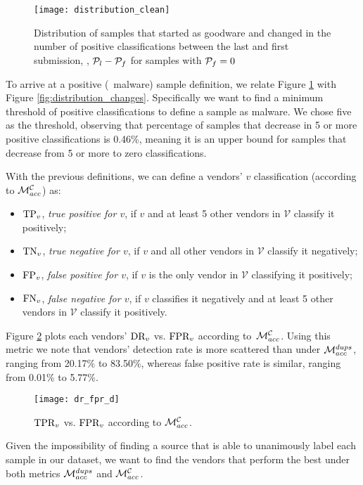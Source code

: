 \begin{figure}[!h]
	\centering
	\texttt{[image: distribution\_clean]}
	\caption{Distribution of samples that started as goodware and changed in the number of positive classifications between the last and first submission, \ie, $\mathcal{P}_{l}-\mathcal{P}_{f}$ for samples with $\mathcal{P}_{f}=0$}
	\label{fig:distribution_clean}
\end{figure}

To arrive at a positive (\ie\ malware) sample definition, we relate Figure \ref{fig:distribution_clean} with Figure \ref{fig:distribution_changes}.
Specifically we want to find a minimum threshold of positive classifications to define a sample as malware.
We chose five as the threshold, observing that percentage of samples that decrease in 5 or more positive classifications is 0.46\%, meaning it is an upper bound for samples that decrease from 5 or more to zero classifications. 

With the previous definitions, we can define a vendors' $v$ classification (according to $\mathcal{M}_{acc}^{\mathcal{C}}$) as:

\begin{itemize}%
	\item $\textrm{TP}_v$, \emph{true positive for $v$}, if $v$ and at least 5 other vendors in $\mathcal{V}$ classify it positively;
	\item $\textrm{TN}_v$, \emph{true negative for $v$}, if $v$ and all other vendors in $\mathcal{V}$ classify it negatively;
	\item $\textrm{FP}_v$, \emph{false positive for $v$}, if $v$ is the only vendor in $\mathcal{V}$ classifying it positively;
	\item $\textrm{FN}_v$, \emph{false negative for $v$}, if $v$ classifies it negatively and at least 5 other vendors in $\mathcal{V}$ classify it positively.
\end{itemize}

Figure \ref{fig:dr_fpr_d} plots each vendors' $\textrm{DR}_v$ vs. $\textrm{FPR}_v$ according to~$\mathcal{M}_{acc}^{\mathcal{C}}$.
Using this metric we note that vendors' detection rate is more scattered than under $\mathcal{M}_{acc}^{{dups}}$, ranging from 20.17\% to 83.50\%, whereas false positive rate is similar, ranging from 0.01\% to 5.77\%.

\begin{figure}[!h]
	\centering
	\texttt{[image: dr\_fpr\_d]}
	\caption{$\textrm{TPR}_v$ vs. $\textrm{FPR}_v$ according to $\mathcal{M}_{acc}^{\mathcal{C}}$.}
	\label{fig:dr_fpr_d}
\end{figure}

Given the impossibility of finding a source that is able to unanimously label each sample in our dataset, we want to find the vendors that perform the best under both metrics $\mathcal{M}_{acc}^{{dups}}$ and $\mathcal{M}_{acc}^{\mathcal{C}}$.

